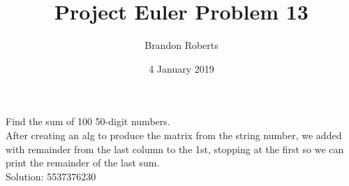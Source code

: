 \documentclass{article}
\begin{document}
\title{Project Euler Problem 13}
\author{Brandon Roberts}
\date{4 January 2019}

\maketitle

Find the sum of 100 50-digit numbers.\\
After creating an alg to produce the matrix from the string number, we added with remainder from the last column to the 1st, 
stopping at the first so we can print the remainder of the last sum.\\
Solution: 5537376230
\end{document}
